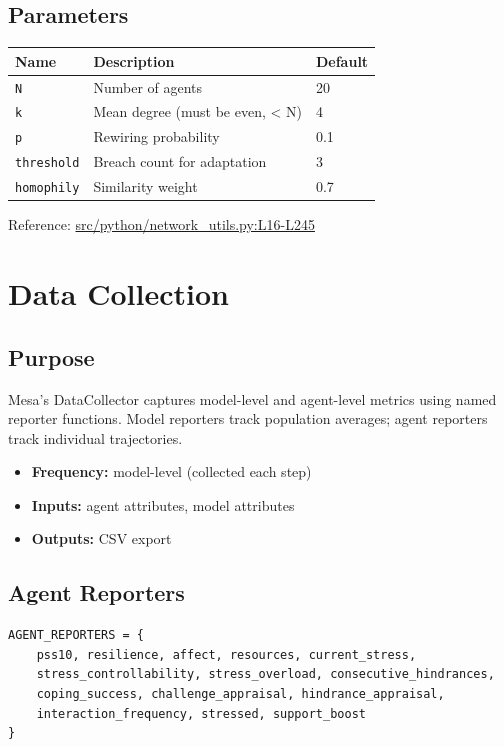 \documentclass[
  letterpaper,
  DIV=11,
  numbers=noendperiod]{scrartcl}
\providecommand{\tightlist}{%
  \setlength{\itemsep}{0pt}\setlength{\parskip}{0pt}}
\newcommand{\trow}[3]{%
  \texttt{\allowbreak #1} & #2 & #3 \\
}
\begin{document}
\subsection{Parameters}\label{parameters-9}

\begin{tabularx}{\textwidth}{p{4.5cm}Xp{2cm}}
\toprule
\textbf{Name} & \textbf{Description} & \textbf{Default} \\
\midrule
\trow{N}{Number of agents}{20}
\trow{k}{Mean degree (must be even, < N)}{4}
\trow{p}{Rewiring probability}{0.1}
\trow{threshold}{Breach count for adaptation}{3}
\trow{homophily}{Similarity weight}{0.7}
\bottomrule
\end{tabularx}

Reference:
\href{https://github.com/namakala/abm-simulation/blob/84ff9b37fb0c569bef9f122e789d9c23a89348ec/src/python/network_utils.py\#L16-L245}{src/python/network\_utils.py:L16-L245}

\section{Data Collection}\label{data-collection}

\subsection{Purpose}\label{purpose-13}

Mesa's DataCollector captures model-level and agent-level metrics using
named reporter functions. Model reporters track population averages;
agent reporters track individual trajectories.

\begin{itemize}
\tightlist
\item
  \textbf{Frequency:} model-level (collected each step)
\item
  \textbf{Inputs:} agent attributes, model attributes
\item
  \textbf{Outputs:} CSV export
\end{itemize}

\subsection{Agent Reporters}\label{agent-reporters}

\begin{verbatim}
AGENT_REPORTERS = {
    pss10, resilience, affect, resources, current_stress,
    stress_controllability, stress_overload, consecutive_hindrances,
    coping_success, challenge_appraisal, hindrance_appraisal,
    interaction_frequency, stressed, support_boost
}
\end{verbatim}
\end{document}

